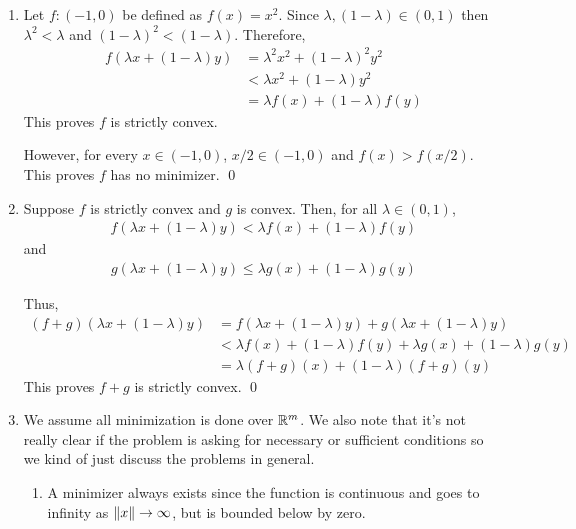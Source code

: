 \documentclass[10pt]{article}
\begin{document}
\begin{solution}[Solution]
\begin{enumerate}[label=(\alph*)]
    \item Let \( f: (-1,0) \) be defined as \( f(x) = x^2 \). Since \( \lambda,(1-\lambda) \in (0,1) \) then \( \lambda^2 < \lambda \) and \( (1-\lambda)^2 < (1-\lambda) \). Therefore,
        \begin{align*}
            f( \lambda x + (1-\lambda)y) 
            &= \lambda^2 x^2 + (1-\lambda)^2 y^2
            \\&< \lambda x^2 + (1-\lambda) y^2 
            \\&= \lambda f(x) + (1-\lambda)f(y)
        \end{align*}
        This proves \( f \) is strictly convex.
        
        However, for every \( x\in (-1,0) \), \( x/2 \in (-1,0) \) and \( f(x) > f(x/2) \). This proves \( f \) has no minimizer. \qed

    \item Suppose \( f \) is strictly convex and \( g \) is convex. Then, for all \( \lambda \in (0,1) \),
        \begin{align*}
            f( \lambda x + (1-\lambda) y) < \lambda f(x) + (1-\lambda)f(y)
        \end{align*}
        and
        \begin{align*}
            g( \lambda x + (1-\lambda) y) \leq \lambda g(x) + (1-\lambda)g(y)
        \end{align*}
        
        Thus,
        \begin{align*}
            (f+g)(\lambda x + (1-\lambda)y)
            &= f(\lambda x + (1-\lambda)y) + g(\lambda x + (1-\lambda)y)
            \\&< \lambda f(x) + (1-\lambda) f(y) + \lambda g(x) + (1-\lambda)g(y)
            \\&= \lambda (f+g)(x) + (1-\lambda) (f+g)(y)
        \end{align*}
        This proves \( f+g \) is strictly convex. \qed
        
    \item 
        We assume all minimization is done over \( \mathbb{R}^m \). We also note that it's not really clear if the problem is asking for necessary or sufficient conditions so we kind of just discuss the problems in general.
        \begin{enumerate}[label=(\roman*)]
            \item 
                A minimizer always exists since the function is continuous and goes to infinity as \( \left\lVert x\right\rVert \to \infty \), but is bounded below by zero.
                

\end{enumerate}
\end{enumerate}
\end{solution}
\end{document}

